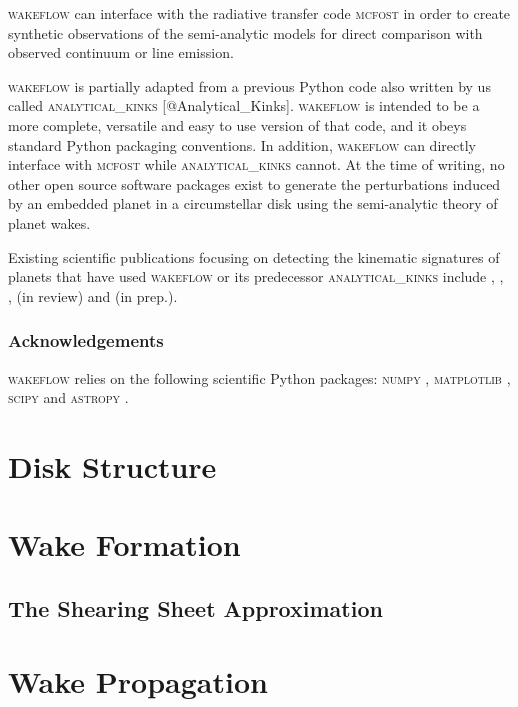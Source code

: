 \textsc{wakeflow} can interface with the radiative transfer code  \textsc{mcfost} \citep{pinte2006,pinte2009} in order to create synthetic observations of the semi-analytic models for direct comparison with observed continuum or line emission.

\textsc{wakeflow} is partially adapted from a previous Python code also written by us called \textsc{analytical\_kinks} [@Analytical\_Kinks]. 
\textsc{wakeflow} is intended to be a more complete, versatile and easy to use version of that code, and it obeys standard Python packaging conventions.
In addition, \textsc{wakeflow} can directly interface with \textsc{mcfost} while \textsc{analytical\_kinks} cannot.
At the time of writing, no other open source software packages exist to generate the perturbations induced by an embedded planet in a circumstellar disk using the semi-analytic theory of planet wakes.

Existing scientific publications focusing on detecting the kinematic signatures of planets that have used \textsc{wakeflow} or its predecessor \textsc{analytical\_kinks} include \citet{bollati2021}, \citet{calcino2022}, \citet{teague2022}, \citeauthor{garginreview} (in review) and \citeauthor{fasanoinprep.} (in prep.).

\subsubsection{Acknowledgements}

\textsc{wakeflow} relies on the following scientific Python packages: \textsc{numpy} \citep{harris2020}, \textsc{matplotlib} \citep{hunter2007}, \textsc{scipy} \citep{virtanen2020} and \textsc{astropy} \citep{astropycollaboration2022}.

\section{Disk Structure} \label{sec:diskstruct}

\section{Wake Formation} 

\subsection{The Shearing Sheet Approximation}

\section{Wake Propagation} 

